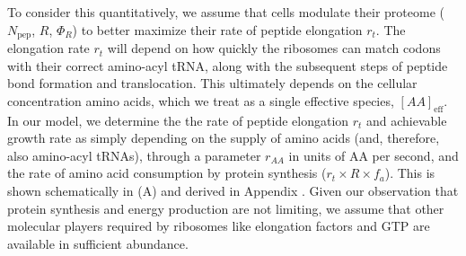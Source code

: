 
To consider this quantitatively, we assume that cells modulate their proteome
($N_\text{pep}$, $R$, $\Phi_R$) to better maximize their rate of peptide
elongation $r_t$. The elongation rate $r_t$ will depend on how quickly the ribosomes can
match codons with their correct amino-acyl tRNA, along with the subsequent steps
of peptide bond formation and translocation. This ultimately depends on the
cellular concentration amino acids, which we treat as a single effective
species, $[AA]_\text{eff}$. In our model, we determine the the rate of peptide
elongation $r_t$ and achievable growth rate as simply depending on the supply of
amino acids (and, therefore, also amino-acyl tRNAs), through a parameter
$r_{AA}$ in units of AA per second, and the rate of amino acid consumption by
protein synthesis ($r_t \times R \times f_a$). This is shown schematically in
(A) and derived in Appendix . Given our observation
that protein synthesis and energy production are not limiting, we
assume that other molecular players required by ribosomes like elongation
factors and GTP are available in sufficient abundance.

%

